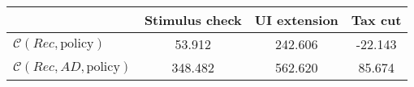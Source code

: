 \begin{tabular}{@{}lccc@{}} 
\toprule 
                          & Stimulus check      & UI extension    & Tax cut    \\  \midrule 
$\mathcal{C}(Rec,\text{policy})$ & 53.912  & 242.606  & -22.143     \\ 
$\mathcal{C}(Rec, AD,\text{policy})$ & 348.482  & 562.620  & 85.674     \\ 
\end{tabular}  
